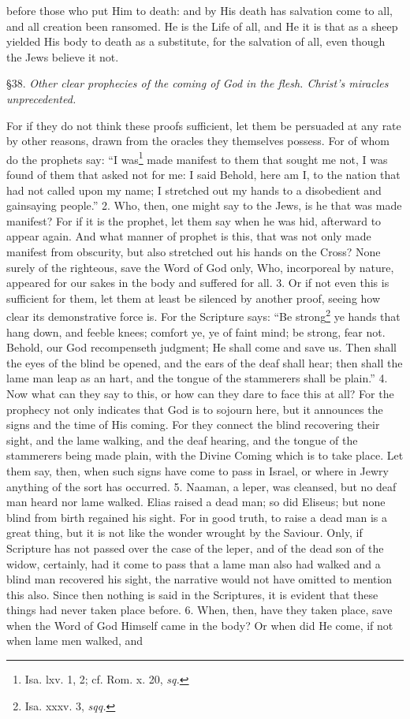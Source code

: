 before those who put Him to death: and by His death has salvation come to all, and all creation been ransomed. He is the Life of all, and He it is that as a sheep yielded His body to death as a substitute, for the salvation of all, even though the Jews believe it not.


§38. \emph{Other clear prophecies of the coming of God in the flesh. Christ’s miracles unprecedented.}

For if they do not think these proofs sufficient, let them be persuaded at any rate by other reasons, drawn from the oracles they themselves possess. For of whom do the prophets say: “I was\footnote{Isa. lxv. 1, 2; cf. Rom. x. 20, \emph{sq.}} made manifest to them that sought me not, I was found of them that asked not for me: I said Behold, here am I, to the nation that had not called upon my name; I stretched out my hands to a disobedient and gainsaying people.” 2. Who, then, one might say to the Jews, is he that was made manifest? For if it is the prophet, let them say when he was hid, afterward to appear again. And what manner of prophet is this, that was not only made manifest from obscurity, but also stretched out his hands on the Cross? None surely of the righteous, save the Word of God only, Who, incorporeal by nature, appeared for our sakes in the body and suffered for all. 3. Or if not even this is sufficient for them, let them at least be silenced by another proof, seeing how clear its demonstrative force is. For the Scripture says: “Be strong\footnote{Isa. xxxv. 3, \emph{sqq.}} ye hands that hang down, and feeble knees; comfort ye, ye of faint mind; be strong, fear not. Behold, our God recompenseth judgment; He shall come and save us. Then shall the eyes of the blind be opened, and the ears of the deaf shall hear; then shall the lame man leap as an hart, and the tongue of the stammerers shall be plain.” 4. Now what can they say to this, or how can they dare to face this at all? For the prophecy not only indicates that God is to sojourn here, but it announces the signs and the time of His coming. For they connect the blind recovering their sight, and the lame walking, and the deaf hearing, and the tongue of the stammerers being made plain, with the Divine Coming which is to take place. Let them say, then, when such signs have come to pass in Israel, or where in Jewry anything of the sort has occurred. 5. Naaman, a leper, was cleansed, but no deaf man heard nor lame walked. Elias raised a dead man; so did Eliseus; but none blind from birth regained his sight. For in good truth, to raise a dead man is a great thing, but it is not like the wonder wrought by the Saviour. Only, if Scripture has not passed over the case of the leper, and of the dead son of the widow, certainly, had it come to pass that a lame man also had walked and a blind man recovered his sight, the narrative would not have omitted to mention this also. Since then nothing is said in the Scriptures, it is evident that these things had never taken place before. 6. When, then, have they taken place, save when the Word of God Himself came in the body? Or when did He come, if not when lame men walked, and 
